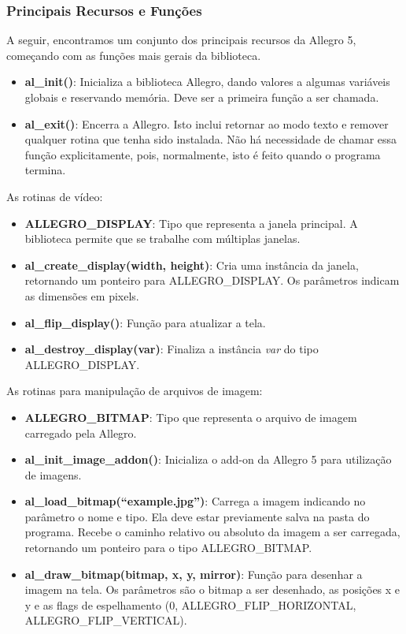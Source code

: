 \subsubsection{Principais Recursos e Funções}
%
A seguir, encontramos um conjunto dos principais recursos da Allegro 5, começando com as funções mais gerais da biblioteca.
%
\begin{itemize}
 \item \textbf{al\_init()}: Inicializa a biblioteca Allegro, dando valores a algumas variáveis globais e reservando memória. 
 Deve ser a primeira função a ser chamada.
 \item \textbf{al\_exit()}: Encerra a Allegro. Isto inclui retornar ao modo texto e remover qualquer rotina que tenha sido instalada. 
 Não há necessidade de chamar essa função explicitamente, pois, normalmente, isto é feito quando o programa termina.
\end{itemize}
%
As rotinas de vídeo:
%
\begin{itemize}
 \item \textbf{ALLEGRO\_DISPLAY}: Tipo que representa a janela principal. A biblioteca permite que se trabalhe com múltiplas janelas.
 \item \textbf{al\_create\_display(width, height)}: Cria uma instância da janela, retornando um ponteiro para ALLEGRO\_DISPLAY. 
 Os parâmetros indicam as dimensões em pixels.
 \item \textbf{al\_flip\_display()}: Função para atualizar a tela.
 \item \textbf{al\_destroy\_display(var)}: Finaliza a instância \textit{var} do tipo ALLEGRO\_DISPLAY\*.
\end{itemize}
%
As rotinas para manipulação de arquivos de imagem:
%
\begin{itemize}
 \item \textbf{ALLEGRO\_BITMAP}: Tipo que representa o arquivo de imagem carregado pela Allegro.
 \item \textbf{al\_init\_image\_addon()}: Inicializa o add-on da Allegro 5 para utilização de imagens.
 \item \textbf{al\_load\_bitmap(``example.jpg'')}: Carrega a imagem indicando no parâmetro o nome e tipo. Ela deve estar previamente salva na pasta 
 do programa. Recebe o caminho relativo ou absoluto da imagem a ser carregada, retornando um ponteiro para o tipo ALLEGRO\_BITMAP.
 \item \textbf{al\_draw\_bitmap(bitmap, x, y, mirror)}: Função para desenhar a imagem na tela. Os parâmetros são o bitmap a ser desenhado, as 
 posições x e y e as flags de espelhamento (0, ALLEGRO\_FLIP\_HORIZONTAL, ALLEGRO\_FLIP\_VERTICAL).
\end{itemize}
